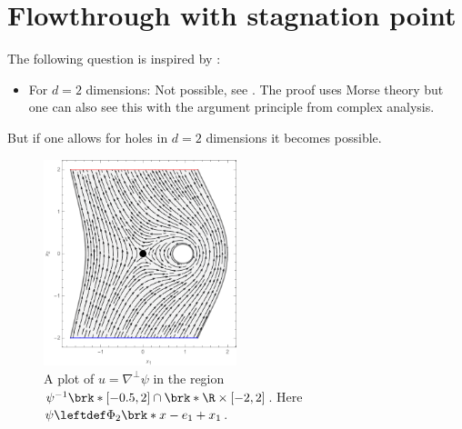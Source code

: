 \section{Flowthrough with stagnation point}

\begin{frame}
  The following question is inspired by \autocite{Alber1992}:
  \questionFlowthrough
\end{frame}

\begin{frame}

  {}
  \begin{answer}
    \begin{itemize}
      \item For $d=2$ dimensions: Not possible, see \autocite{Koppenhoefer2024}.
        The proof uses Morse theory but one can also see this with the argument principle from complex analysis.
    \end{itemize}
  \end{answer}
\end{frame}

\begin{frame}
  But if one allows for holes in $d=2$ dimensions it becomes possible.
  \begin{figure}
    \centering
    \includegraphics[width=0.5\textwidth]{../Plots/n2_hvf_InflowOutflow_asymmetric_gray_2.pdf}
    \caption{A plot of $u=\nabla^\perp\psi$ in the region $\psi^{-1}\brk*{[-0.5,2]}\cap \brk*{\R\times[-2,2]}$.
    Here $\psi\leftdef\Phi_2\brk*{x-e_1}+x_1$.}
    \label{pl:n2_hvf_InflowOutflow_asymmetric_single}
  \end{figure}
\end{frame}


